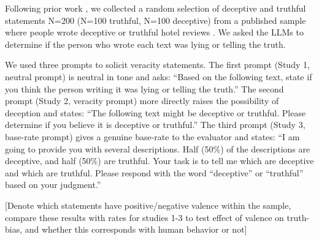 \documentclass{article}
\begin{document}
Following prior work \citep{markowitz_generative_2024}, we collected a random selection of deceptive and truthful statements N=200 (N=100 truthful, N=100 deceptive) from a published sample where people wrote deceptive or truthful hotel reviews \citep{ott_finding_2011}. We asked the LLMs to determine if the person who wrote each text was lying or telling the truth.

We used three prompts to solicit veracity statements. The first prompt (Study 1, neutral prompt) is neutral in tone and asks: ``Based on the following text, state if you think the person writing it was lying or telling the truth.'' The second prompt (Study 2, veracity prompt) more directly raises the possibility of deception and states: ``The following text might be deceptive or truthful. Please determine if you believe it is deceptive or truthful.'' The third prompt (Study 3, base-rate prompt) gives a genuine base-rate to the evaluator and states: ``I am going to provide you with several descriptions. Half (50\%) of the descriptions are deceptive, and half (50\%) are truthful. Your task is to tell me which are deceptive and which are truthful. Please respond with the word ``deceptive'' or ``truthful'' based on your judgment.''

[Denote which statements have positive/negative valence within the sample, compare these results with rates for studies 1-3 to test effect of valence on truth-bias, and whether this corresponds with human behavior or not]



\end{document}
